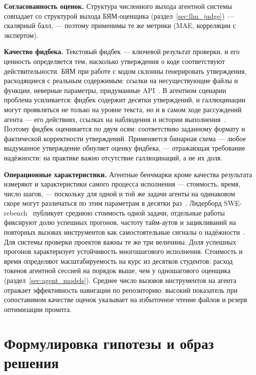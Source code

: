 \textbf{Согласованность оценок.} Структура численного выхода агентной
системы совпадает со структурой выхода БЯМ-оценщика
(раздел~\ref{sec:llm_judge}) --- скалярный балл, --- поэтому применимы
те же метрики (MAE, корреляции с экспертом).
 
\textbf{Качество фидбека.} Текстовый фидбек --- ключевой результат
проверки, и его ценность определяется тем, насколько
утверждения о коде соответствуют действительности. БЯМ при работе с
кодом склонны генерировать утверждения, расходящиеся с реальным
содержимым: ссылки на несуществующие файлы и функции, неверные
параметры, придуманные API~\cite{codehallu2024, automotivehallu2025}. В агентном сценарии проблема
усиливается: фидбек содержит десятки утверждений, и галлюцинации могут
проявляться не только на уровне текста, но и в самом ходе рассуждений
агента --- его действиях, ссылках на наблюдения и истории
выполнения~\cite{mirage2025}. Поэтому фидбек оценивается по двум осям:
соответствию заданному формату и фактической корректности утверждений.
Применяется бинарная схема --- любое выдуманное утверждение обнуляет
оценку фидбека, --- отражающая требование надёжности: на практике важно
отсутствие галлюцинаций, а не их доля.
 
\textbf{Операционные характеристики.} Агентные бенчмарки кроме качества
результата измеряют и характеристики самого процесса исполнения ---
стоимость, время, число шагов, --- поскольку для одной и той же задачи
агенты на одинаковом скоре могут различаться по этим параметрам в
десятки раз~\cite{secomprehensive2026, agenteval2025}. Лидерборд
SWE-rebench~\cite{swerebench2025} публикует
среднюю стоимость одной задачи, отдельные работы фиксируют долю
успешных прогонов, частоту тайм-аутов и зацикливаний на повторных
вызовах инструментов как самостоятельные сигналы о
надёжности~\cite{secomprehensive2026}. Для системы
проверки проектов важны те же три величины. Доля успешных прогонов
характеризует устойчивость многошагового исполнения. Стоимость и время
определяют масштабируемость на курс из десятков студентов: расход
токенов агентной сессией на порядок выше, чем у одношагового оценщика
(раздел~\ref{sec:agent_models}). Среднее число вызовов инструментов на
агента отражает эффективность навигации по репозиторию: высокий
показатель при сопоставимом качестве оценок указывает на избыточное
чтение файлов и резерв оптимизации промпта.

\section{Формулировка гипотезы и образ решения}

